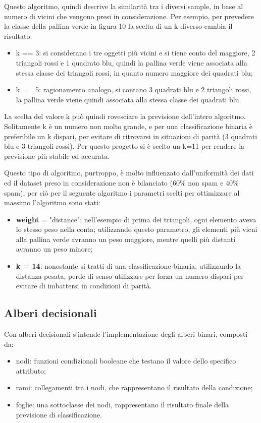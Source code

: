\documentclass[12pt,a4paper]{article}
\begin{document}
Questo algoritmo, quindi descrive la similarità tra i diversi sample, in base al numero di vicini che vengono presi in considerazione. Per esempio, per prevedere la classe della pallina verde in figura 10 la scelta di un k diverso cambia il risultato:
\begin{itemize}
    \item k == 3: si considerano i tre oggetti più vicini e si tiene conto del maggiore, 2 triangoli rossi e 1 quadrato blu, quindi la pallina verde viene associata alla stessa classe dei triangoli rossi, in quanto numero maggiore dei quadrati blu;
    \item k == 5: ragionamento analogo, si contano 3 quadrati blu e 2 triangoli rossi, la pallina verde viene quindi associata alla stessa classe dei quadrati blu.
\end{itemize}

La scelta del valore k può quindi rovesciare la previsione dell'intero algoritmo. Solitamente k è un numero non molto grande, e per una classificazione binaria è preferibile un k dispari, per evitare di ritrovarsi in situazioni di parità (3 quadrati blu e 3 triangoli rossi). \hfill \break
Per questo progetto si è scelto un k=11 per rendere la previsione più stabile ed accurata.

Questo tipo di algoritmo, purtroppo, è molto influenzato dall'uniformità dei dati ed il dataset preso in considerazione non è bilanciato (60\% non spam e 40\% spam), per ciò per il seguente algoritmo i parametri scelti per ottimizzare al massimo l'algoritmo sono stati:
\begin{itemize}
    \item \textbf{weight} = "distance": nell'esempio di prima dei triangoli, ogni elemento aveva lo stesso peso nella conta; utilizzando questo parametro, gli elementi più vicni alla pallina verde avranno un peso maggiore, mentre quelli più distanti avranno un peso minore;
    \item \textbf{k = 14}: nonostante si tratti di una classificazione binaria, utilizzando la distanza pesata, perde di senso utilizzare per forza un numero dispari per evitare di imbattersi in condizioni di parità.
\end{itemize}

\subsection{Alberi  decisionali}
Con alberi decisionali s'intende l'implementazione degli alberi binari, composti da:
\begin{itemize}
    \item nodi: funzioni condizionali booleane che testano il valore dello specifico attributo;
    \item rami: collegamenti tra i nodi, che rappresentano il risultato della condizione;
    \item foglie: una sottoclasse dei nodi, rappresentano il risultato finale della previsione di classificazione.
\end{itemize}
\end{document}
